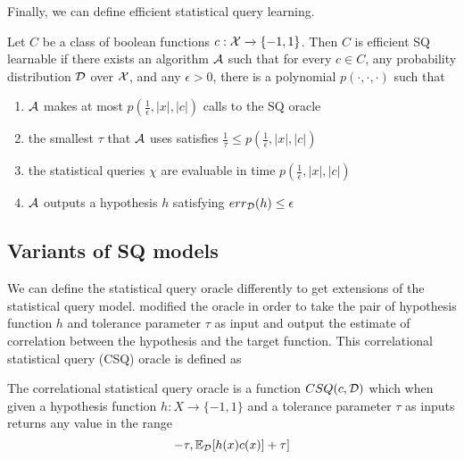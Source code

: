 Finally, we can define efficient statistical query learning.

\begin{definition}
Let $C$ be a class of boolean functions $c: \mathcal{X} \xrightarrow{} \{-1, 1\}$. Then $C$ is efficient SQ learnable if there exists an algorithm $\mathcal{A}$ such that for every $c \in C$, any probability distribution $\mathcal{D}$ over $\mathcal{X}$, and any $\epsilon > 0$, there is a polynomial $p(\cdot, \cdot, \cdot)$ such that
\begin{enumerate}
    \item $\mathcal{A}$ makes at most $p(\frac{1}{\epsilon}, |x|, |c|)$ calls to the SQ oracle
    \item the smallest $\tau$ that $\mathcal{A}$ uses satisfies $\frac{1}{\tau} \leq p(\frac{1}{\epsilon}, |x|, |c|)$
    \item the statistical queries $\chi$ are evaluable in time $p(\frac{1}{\epsilon}, |x|, |c|)$
    \item $\mathcal{A}$ outputs a hypothesis $h$ satisfying $err_{\mathcal{D}}(h) \leq \epsilon$
\end{enumerate}
    
\end{definition}

\subsection{Variants of SQ models}
\label{variants}
We can define the statistical query oracle differently to get extensions of the statistical query model. \citet{bshouty_using_2001} modified the oracle in order to take the pair of hypothesis function $h$ and tolerance parameter $\tau$ as input and output the estimate of correlation between the hypothesis and the target function. This correlational statistical query (CSQ) oracle is defined as

\begin{definition}
The correlational statistical query oracle is a function $CSQ(c, \mathcal{D})$ which when given a hypothesis function $h: X \xrightarrow{} \{-1, 1\}$ and a tolerance parameter $\tau$ as inputs returns any value in the range
\begin{equation*}
    [\mathbb{E}_{\cD}[h(x)c(x)] - \tau, \mathbb{E}_{\cD}[h(x)c(x)] + \tau]
\end{equation*}
\end{definition}

